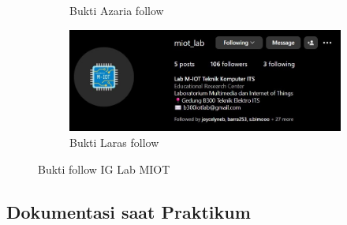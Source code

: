 \begin{enumerate}
\begin{figure}[H]
\begin{subfigure}{0.3\linewidth}
			\caption{Bukti Azaria follow}
			\label{fig:gambar36}
		\end{subfigure}
		\begin{subfigure}{0.8\linewidth}
			\centering
			\includegraphics[width=\linewidth]{P1/img/larasfollow.jpg}
			\caption{Bukti Laras follow}
			\label{fig:gambar37}
		\end{subfigure}
		\caption{Bukti follow IG Lab MIOT}
		\label{fig:dua_gambar}
	\end{figure}
	
\end{enumerate}
\subsection{Dokumentasi saat Praktikum}

